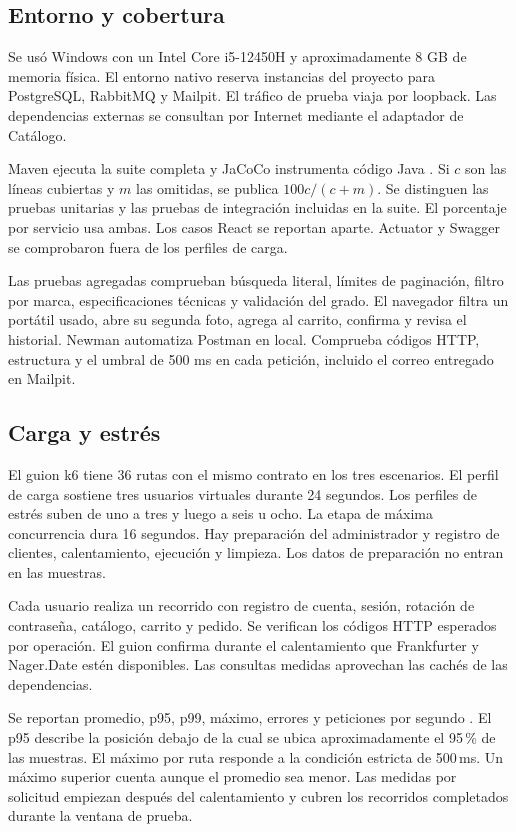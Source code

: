 \documentclass[conference]{IEEEtran}
\begin{document}
\subsection{Entorno y cobertura}
Se usó Windows con un Intel Core i5-12450H y aproximadamente 8 GB de memoria física. El entorno nativo reserva instancias del proyecto para PostgreSQL, RabbitMQ y Mailpit. El tráfico de prueba viaja por loopback. Las dependencias externas se consultan por Internet mediante el adaptador de Catálogo.

Maven ejecuta la suite completa y JaCoCo instrumenta código Java \cite{jacoco}. Si $c$ son las líneas cubiertas y $m$ las omitidas, se publica $100c/(c+m)$. Se distinguen las pruebas unitarias y las pruebas de integración incluidas en la suite. El porcentaje por servicio usa ambas. Los casos React se reportan aparte. Actuator y Swagger se comprobaron fuera de los perfiles de carga.

Las pruebas agregadas comprueban búsqueda literal, límites de paginación, filtro por marca, especificaciones técnicas y validación del grado. El navegador filtra un portátil usado, abre su segunda foto, agrega al carrito, confirma y revisa el historial. Newman automatiza Postman en local. Comprueba códigos HTTP, estructura y el umbral de 500 ms en cada petición, incluido el correo entregado en Mailpit.

\subsection{Carga y estrés}
El guion k6 tiene 36 rutas con el mismo contrato en los tres escenarios. El perfil de carga sostiene tres usuarios virtuales durante 24 segundos. Los perfiles de estrés suben de uno a tres y luego a seis u ocho. La etapa de máxima concurrencia dura 16 segundos. Hay preparación del administrador y registro de clientes, calentamiento, ejecución y limpieza. Los datos de preparación no entran en las muestras.

Cada usuario realiza un recorrido con registro de cuenta, sesión, rotación de contraseña, catálogo, carrito y pedido. Se verifican los códigos HTTP esperados por operación. El guion confirma durante el calentamiento que Frankfurter y Nager.Date estén disponibles. Las consultas medidas aprovechan las cachés de las dependencias.

Se reportan promedio, p95, p99, máximo, errores y peticiones por segundo \cite{k6}. El p95 describe la posición debajo de la cual se ubica aproximadamente el 95\,\% de las muestras. El máximo por ruta responde a la condición estricta de 500\,ms. Un máximo superior cuenta aunque el promedio sea menor. Las medidas por solicitud empiezan después del calentamiento y cubren los recorridos completados durante la ventana de prueba.
\end{document}
